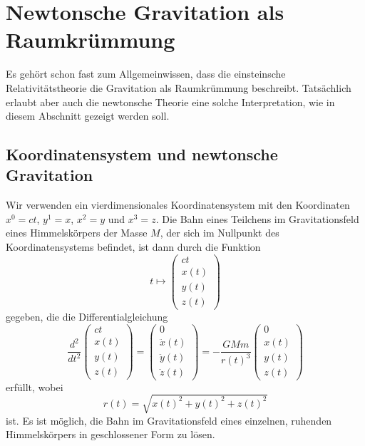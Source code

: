 %
%
\section{Newtonsche Gravitation als Raumkrümmung
\label{buch:kruemmung:section:newton}}
Es gehört schon fast zum Allgemeinwissen, dass die einsteinsche
Relativitätstheorie die Gravitation als Raumkrümmung beschreibt.
Tatsächlich erlaubt aber auch die newtonsche Theorie eine solche
Interpretation, wie in diesem Abschnitt gezeigt werden soll.

%
%
\subsection{Koordinatensystem und newtonsche Gravitation}
Wir verwenden ein vierdimensionales Koordinatensystem mit
den Koordinaten $x^0=ct$, $y^1=x$, $x^2=y$ und $x^3=z$.
Die Bahn eines Teilchens im Gravitationsfeld eines Himmelskörpers
der Masse $M$, der sich im Nullpunkt des Koordinatensystems befindet,
ist dann durch die Funktion
\[
t\mapsto
\begin{pmatrix}
ct\\
x(t)\\
y(t)\\
z(t)
\end{pmatrix}
\]
gegeben, die die Differentialgleichung
\begin{equation}
\frac{d^2}{dt^2}
\begin{pmatrix}
ct\\
x(t)\\
y(t)\\
z(t)
\end{pmatrix}
=
\begin{pmatrix}
0\\
\ddot{x}(t)\\
\ddot{y}(t)\\
\ddot{z}(t)
\end{pmatrix}
=
-
\frac{GMm}{r(t)^3}
\begin{pmatrix}
0\\
x(t)\\
y(t)\\
z(t)
\end{pmatrix}
\label{buch:kruemmung:newton:eqn:dgl}
\end{equation}
erfüllt, wobei
\[
r(t)
=
\sqrt{x(t)^2 + y(t)^2 + z(t)^2}
\]
ist.
Es ist möglich, die Bahn im Gravitationsfeld eines einzelnen,
ruhenden Himmelskörpers in geschlossener Form zu lösen.
